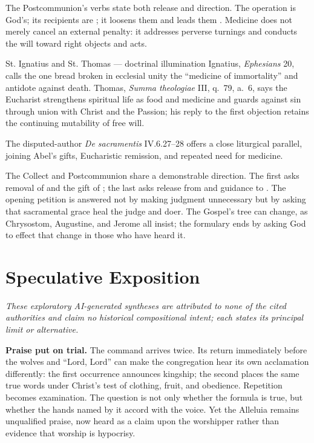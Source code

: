 \begin{deepstudy}
The Postcommunion's verbs state both release and direction. The operation is God's; its recipients are ; it loosens them  and leads them . Medicine does not merely cancel an external penalty: it addresses perverse turnings and conducts the will toward right objects and acts.

\begin{sourcecard}{St. Ignatius and St. Thomas --- doctrinal illumination}
Ignatius, \emph{Ephesians} 20, calls the one bread broken in ecclesial unity the ``medicine of immortality'' and antidote against death. Thomas, \emph{Summa theologiae} III, q.~79, a.~6, says the Eucharist strengthens spiritual life as food and medicine and guards against sin through union with Christ and the Passion; his reply to the first objection retains the continuing mutability of free will.
\end{sourcecard}

The disputed-author \emph{De sacramentis} IV.6.27--28 offers a close liturgical parallel, joining Abel's gifts, Eucharistic remission, and repeated need for medicine.

The Collect and Postcommunion share a demonstrable direction. The first asks removal of  and the gift of ; the last asks release from  and guidance to . The opening petition is answered not by making judgment unnecessary but by asking that sacramental grace heal the judge and doer. The Gospel's tree can change, as Chrysostom, Augustine, and Jerome all insist; the formulary ends by asking God to effect that change in those who have heard it.

\section*{Speculative Exposition}

\noindent\emph{These exploratory AI-generated syntheses are attributed to none of the cited authorities and claim no historical compositional intent; each states its principal limit or alternative.}

\noindent\textbf{Praise put on trial.\enspace{}}
The command  arrives twice. Its return immediately before the wolves and ``Lord, Lord'' can make the congregation hear its own acclamation differently: the first occurrence announces kingship; the second places the same true words under Christ's test of clothing, fruit, and obedience. Repetition becomes examination. The question is not only whether the formula is true, but whether the hands named by it accord with the voice. Yet the Alleluia remains unqualified praise, now heard as a claim upon the worshipper rather than evidence that worship is hypocrisy.


\end{deepstudy}
